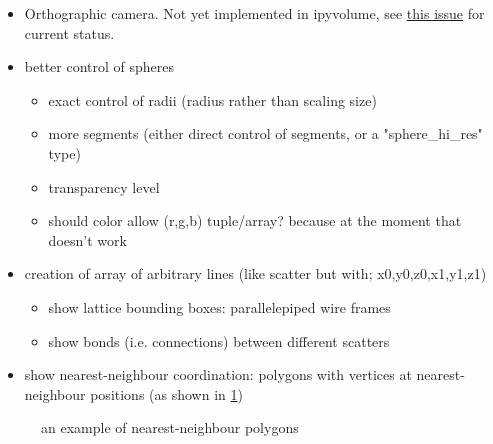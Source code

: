 \documentclass[10pt,parskip=half,
	toc=sectionentrywithdots,
	bibliography=totocnumbered,
	captions=tableheading,numbers=noendperiod]{scrartcl}
\providecommand{\tightlist}{%
  \setlength{\itemsep}{0pt}\setlength{\parskip}{0pt}}
\begin{document}
\begin{itemize}
\tightlist
\item
  Orthographic camera. Not yet implemented in ipyvolume, see
  \href{https://github.com/maartenbreddels/ipyvolume/issues/31}{this
  issue} for current status.
\item
  better control of spheres

  \begin{itemize}
  \tightlist
  \item
    exact control of radii (radius rather than scaling size)
  \item
    more segments (either direct control of segments, or a
    "sphere\_hi\_res" type)
  \item
    transparency level
  \item
    should color allow (r,g,b) tuple/array? because at the moment that
    doesn't work
  \end{itemize}
\item
  creation of array of arbitrary lines (like scatter but with;
  x0,y0,z0,x1,y1,z1)

  \begin{itemize}
  \tightlist
  \item
    show lattice bounding boxes: parallelepiped wire frames
  \item
    show bonds (i.e. connections) between different scatters
  \end{itemize}
\item
  show nearest-neighbour coordination: polygons with vertices at
  nearest-neighbour positions (as shown in \cref{fig:nnpolygons})
\end{itemize}

\begin{figure}[H]\begin{center}\end{center}\caption{an example of nearest-neighbour polygons}\label{fig:nnpolygons}
    \end{figure}
\end{document}
